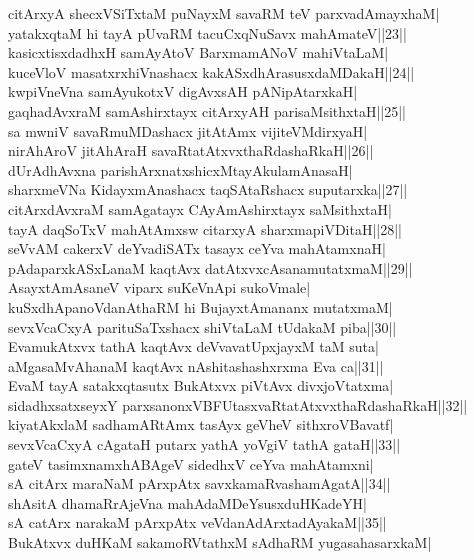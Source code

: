 \documentclass{article}
\begin{document}
citArxyA shecxVSiTxtaM puNayxM savaRM teV parxvadAmayxhaM|\\
yatakxqtaM hi tayA pUvaRM tacuCxqNuSavx mahAmateV||23||\\
kasicxtisxdadhxH samAyAtoV BarxmamANoV mahiVtaLaM|\\
kuceVloV masatxrxhiVnashacx kakASxdhArasusxdaMDakaH||24||\\
kwpiVneVna samAyukotxV digAvxsAH pANipAtarxkaH|\\
gaqhadAvxraM samAshirxtayx citArxyAH parisaMsithxtaH||25||\\
sa mwniV savaRmuMDashacx jitAtAmx vijiteVMdirxyaH|\\
nirAhAroV jitAhAraH savaRtatAtxvxthaRdashaRkaH||26||\\
dUrAdhAvxna parishArxnatxshicxMtayAkulamAnasaH|\\
sharxmeVNa KidayxmAnashacx taqSAtaRshacx suputarxka||27||\\
citArxdAvxraM samAgatayx CAyAmAshirxtayx saMsithxtaH|\\
tayA daqSoTxV mahAtAmxsw citarxyA sharxmapiVDitaH||28||\\
seVvAM cakerxV deYvadiSATx tasayx ceYva mahAtamxnaH|\\
pAdaparxkASxLanaM kaqtAvx datAtxvxcAsanamutatxmaM||29||\\
AsayxtAmAsaneV viparx suKeVnApi sukoVmale|\\
kuSxdhApanoVdanAthaRM hi BujayxtAmananx mutatxmaM|\\
sevxVcaCxyA parituSaTxshacx shiVtaLaM tUdakaM piba||30||\\
EvamukAtxvx tathA kaqtAvx deVvavatUpxjayxM taM suta|\\
aMgasaMvAhanaM kaqtAvx nAshitashashxrxma Eva ca||31||\\
EvaM tayA satakxqtasutx BukAtxvx piVtAvx divxjoVtatxma|\\
sidadhxsatxseyxY parxsanonxVBFUtasxvaRtatAtxvxthaRdashaRkaH||32||\\
kiyatAkxlaM sadhamARtAmx tasAyx geVheV sithxroVBavatf|\\
sevxVcaCxyA cAgataH putarx yathA yoVgiV tathA gataH||33||\\
gateV tasimxnamxhABAgeV sidedhxV ceYva mahAtamxni|\\
sA citArx maraNaM pArxpAtx savxkamaRvashamAgatA||34||\\
shAsitA dhamaRrAjeVna mahAdaMDeYsusxduHKadeYH|\\
sA catArx narakaM pArxpAtx veVdanAdArxtadAyakaM||35||\\
BukAtxvx duHKaM sakamoRVtathxM sAdhaRM yugasahasarxkaM|\\
\end{document}
